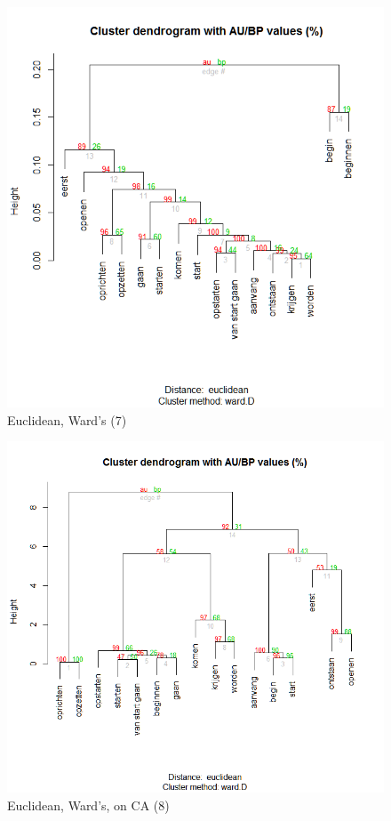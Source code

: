 \begin{figure}
\includegraphics[height=.3\textheight]{figures/Vandevoorde2-img36.png}
\caption{\label{fig:key:36}  Euclidean, Ward’s (7)}
\end{figure}

\begin{figure}
\includegraphics[height=.3\textheight]{figures/Vandevoorde2-img37.png}
\caption{\label{fig:key:37}  Euclidean, Ward’s, on CA (8)}
\end{figure}

